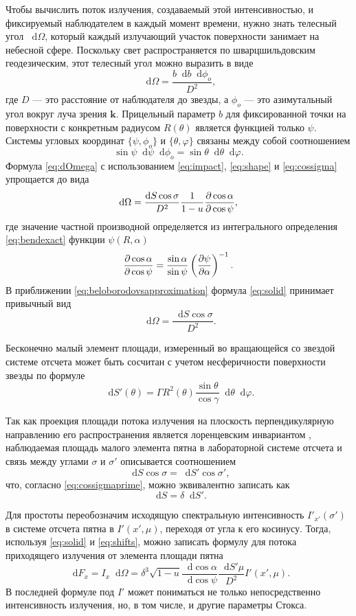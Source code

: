 \documentclass[14pt,a4paper]{extarticle}
\newcommand{\be}{\begin{equation}}
\newcommand{\ee}{\end{equation}}
\newcommand*\df {\mathop{}\!\mathrm{d}}
\begin{document}
			Чтобы вычислить поток излучения, создаваемый этой интенсивностью, и фиксируемый наблюдателем в каждый момент времени, нужно знать телесный угол $\df \Omega$, который каждый излучающий участок поверхности занимает на небесной сфере. 
			Поскольку свет распространяется по шварцшильдовским геодезическим, этот телесный угол можно выразить \cite{Pechenick1983}
			в виде 
			\be\label{eq:dOmega}
				\df \Omega=\frac{b \df b \df \phi_o}{D^2},
			\ee
			где $D$ --- это расстояние от наблюдателя до звезды, а $\phi_o$ --- это азимутальный угол вокруг луча зрения $\bm k$.
			Прицельный параметр $b$ для фиксированной точки на поверхности с конкретным радиусом $R(\theta)$ является функцией только $\psi$. 
			Системы угловых координат $\{\psi,\phi_o\}$ и $\{\theta, \varphi \}$ связаны между собой соотношением
			\be
				\sin\psi \df\psi\df\phi_o=\sin\theta\df\theta\df\varphi.
			\ee
			Формула \eqref{eq:dOmega} с использованием \eqref{eq:impact}, \eqref{eq:shape} и \eqref{eq:cossigma} упрощается
			\cite{Poutanen2003,Morsink2007} 
			до вида
			\be\label{eq:solid}
				\df \Omega=\frac{\df S\cos\sigma}{D^2}\frac1{1-u}\pdv{\cos\alpha}{\cos\psi},
			\ee
			где значение частной производной определяется из интегрального определения  
			\eqref{eq:bendexact} функции $\psi(R,\alpha)$
			\be\label{eq:partial}
				\pdv{\cos\alpha}{\cos\psi}=\frac{\sin\alpha}{\sin\psi}\left(\pdv{\psi}{\alpha}\right)^{-1}.
			\ee
			В приближении \eqref{eq:beloborodovsapproximation} 
			формула \eqref{eq:solid}
			принимает привычный вид 
			\be
				\df \Omega=\frac{\df S\cos\sigma}{D^2}.
			\ee

			Бесконечно малый элемент площади, измеренный во вращающейся со звездой системе отсчета может быть сосчитан  с учетом несферичности поверхности звезды 
			\cite{Morsink2007} по формуле 
			\be
				\df S'(\theta)=\Gamma R^2(\theta)\frac{\sin\theta}{\cos\gamma}\df \theta \df \varphi.
			\ee

			Так как проекция площади потока излучения на плоскость перпендикулярную направлению его распространения является лоренцевским инвариантом 
			\cite{Lightman1975}, наблюдаемая площадь малого элемента пятна в лабораторной системе отсчета и связь между углами $\sigma$ и $\sigma'$ описывается соотношением 
			\be	
				\df S\cos\sigma=\df S'\cos\sigma',
			\ee
			что, согласно \eqref{eq:cossigmaprime}, можно эквивалентно записать как
			\be
				\df S = \delta \df S'.
			\ee


			Для простоты переобозначим исходящую спектральную интенсивность $I'_{x'}(\sigma')$ в системе отсчета пятна в $I'(x',\mu)$, переходя от угла к его косинусу. Тогда, используя \eqref{eq:solid} и \eqref{eq:shifts}, можно записать формулу для потока приходящего излучения от элемента площади пятна   
			\be\label{eq:flux}
				\df F_x=I_x \df \Omega= \delta^3\sqrt{1-u} \frac{\df \cos\alpha}{\df \cos\psi}  \frac{ \df S'\mu}{D^2} I'(x',\mu). 
			\ee
			В последней формуле под $I'$ может пониматься не только непосредственно интенсивность излучения, но, в том числе, и другие параметры Стокса.
\end{document}
